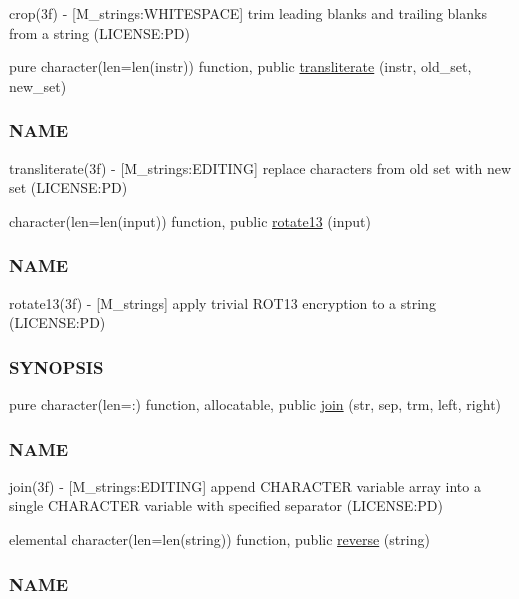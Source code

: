 \begin{DoxyCompactItemize}
\begin{DoxyCompactList}
crop(3f) -\/ \mbox{[}M\+\_\+strings\+:W\+H\+I\+T\+E\+S\+P\+A\+CE\mbox{]} trim leading blanks and trailing blanks from a string (L\+I\+C\+E\+N\+SE\+:PD) \end{DoxyCompactList}\item 
pure character(len=len(instr)) function, public \mbox{\hyperlink{namespacem__strings_aaee428861205782e002f5e7e8fb002f0}{transliterate}} (instr, old\+\_\+set, new\+\_\+set)
\begin{DoxyCompactList}\small\item\em \subsubsection*{N\+A\+ME}

transliterate(3f) -\/ \mbox{[}M\+\_\+strings\+:E\+D\+I\+T\+I\+NG\mbox{]} replace characters from old set with new set (L\+I\+C\+E\+N\+SE\+:PD) \end{DoxyCompactList}\item 
character(len=len(input)) function, public \mbox{\hyperlink{namespacem__strings_af155dcea0c0ccef21bb359040b673014}{rotate13}} (input)
\begin{DoxyCompactList}\small\item\em \subsubsection*{N\+A\+ME}

rotate13(3f) -\/ \mbox{[}M\+\_\+strings\mbox{]} apply trivial R\+O\+T13 encryption to a string (L\+I\+C\+E\+N\+SE\+:PD) \subsubsection*{S\+Y\+N\+O\+P\+S\+IS}\end{DoxyCompactList}\item 
pure character(len=\+:) function, allocatable, public \mbox{\hyperlink{namespacem__strings_a36c4cc6f83b736b4e337a1289694e3d6}{join}} (str, sep, trm, left, right)
\begin{DoxyCompactList}\small\item\em \subsubsection*{N\+A\+ME}

join(3f) -\/ \mbox{[}M\+\_\+strings\+:E\+D\+I\+T\+I\+NG\mbox{]} append C\+H\+A\+R\+A\+C\+T\+ER variable array into a single C\+H\+A\+R\+A\+C\+T\+ER variable with specified separator (L\+I\+C\+E\+N\+SE\+:PD) \end{DoxyCompactList}\item 
elemental character(len=len(string)) function, public \mbox{\hyperlink{namespacem__strings_ab3e5e7af9e9594fdb544f82736a26f17}{reverse}} (string)
\begin{DoxyCompactList}\small\item\em \subsubsection*{N\+A\+ME}


\end{DoxyCompactList}
\end{DoxyCompactItemize}
